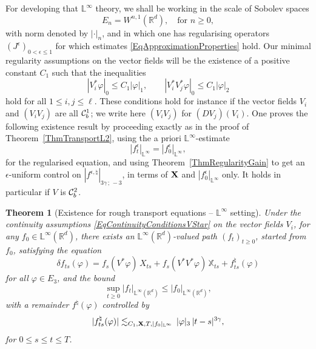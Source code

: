 \documentclass[11pt,a4paper]{amsart}
\newcommand{\RR}{\mathbb{R}}  \newcommand{\CC}{\mathbb{C}}  \newcommand{\LL}{\mathbb{L}}  \newcommand{\WW}{\mathbb{W}}
\newcommand{\bbX}{\mathbb{X}}
\newcommand{\ep}{\epsilon}
\renewcommand{\leq}{\leqslant}
\renewcommand{\geq}{\geqslant}
\theoremstyle{plain}%
\newtheorem{theorem}{Theorem}
\theoremstyle{definition}
\theoremstyle{remark}
\numberwithin{equation}{section} %
\begin{document}
For developing that $\LL^\infty$ theory, we shall be working in the scale of Sobolev spaces 
$$
E_n = W^{n,1}(\RR^d),\quad\textrm{for } n\geq 0,
$$
with norm denoted by $|\cdot|_n$, and in which one has regularising operators $(J^\ep)_{0<\epsilon\leq 1}$ for which estimates \eqref{EqApproximationProperties} hold. Our minimal regularity assumptions on the vector fields will be the existence of a positive constant $C_1$ such that the inequalities
\begin{equation}
\label{EqContinuityConditionsVStar}
|V_i^*\varphi|_0 \leq C_1 |\varphi|_1, \quad\quad |V_i^*V_j^*\varphi|_0 \leq C_1 |\varphi|_2
\end{equation}
hold for all $1\leq i,j\leq\ell$. These conditions hold for instance if the vector fields $V_i$ and $(V_iV_j)$ are all $\mathcal{C}^1_b$; we write here $(V_iV_j)$ for $(DV_j)(V_i)$. One proves the following existence result by proceeding exactly as in the proof of Theorem~\ref{ThmTransportL2}, using the a priori $\LL^\infty$-estimate
$$
| f_t^\ep |_{\LL^\infty} = |f_0^\ep|_{\LL^\infty},
$$
for the regularised equation, and using Theorem~\ref{ThmRegularityGain} to get an $\epsilon$-uniform control on $|f^{\epsilon,\natural}|_{3\gamma\,;\,-3}$, in terms of ${\bf X}$ and $|f_0^\ep|_{\LL^\infty}$ only. It holds in particular if $V$ is $\mathcal{C}^2_b$.

\smallskip 
 
\begin{theorem}[Existence for rough transport equations -- $\LL^\infty$ setting]
\label{ThmExistenceTransportEquationLInfty}
Under the continuity assumptions \eqref{EqContinuityConditionsVStar} on the vector fields $V_i$, for any $f_0\in\LL^\infty(\RR^d)$, there exists an $\LL^\infty(\RR^d)$-valued path $(f_t)_{t\geq 0}$, started from $f_0$, satisfying the equation
$$
\delta f_{ts}(\varphi) = f_s(V^*\varphi)\,X_{ts} + f_s(V^*V^*\varphi)\,\bbX_{ts} + f^\natural_{ts}(\varphi)
$$
for all $\varphi\in E_3$, and the bound
$$ 
\sup_{t\geq 0} | f_t|_{\LL^\infty(\RR^d)}\leq | f_0|_{\LL^\infty(\RR^d)},
$$ 
with a remainder $f^\natural(\varphi)$ controlled by 
\begin{equation}
\label{EqBoundRemainder-bis}
|f^\natural_{ts}(\varphi) | \lesssim_{C_1,{\bfX}, T, |f_0|_{\LL^\infty}} \, |\varphi|_3\,|t-s|^{3\gamma},
\end{equation}
for $0\leq s\leq t\leq T$. 
\end{theorem} 
 

\bigskip


\end{document}
